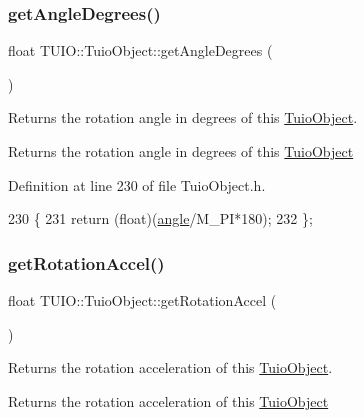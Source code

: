 \subsubsection{\texorpdfstring{get\+Angle\+Degrees()}{getAngleDegrees()}}
{\footnotesize\ttfamily float T\+U\+I\+O\+::\+Tuio\+Object\+::get\+Angle\+Degrees (\begin{DoxyParamCaption}{ }\end{DoxyParamCaption})\hspace{0.3cm}{\ttfamily [inline]}}

Returns the rotation angle in degrees of this \hyperlink{class_t_u_i_o_1_1_tuio_object}{Tuio\+Object}. \begin{DoxyReturn}{Returns}
the rotation angle in degrees of this \hyperlink{class_t_u_i_o_1_1_tuio_object}{Tuio\+Object} 
\end{DoxyReturn}


Definition at line 230 of file Tuio\+Object.\+h.


\begin{DoxyCode}
230                                 \{ 
231             \textcolor{keywordflow}{return} (\textcolor{keywordtype}{float})(\hyperlink{class_t_u_i_o_1_1_tuio_object_a1c5652a3ee1175156f13777f0d8068ee}{angle}/M\_PI*180);
232         \};
\end{DoxyCode}
\mbox{\label{class_t_u_i_o_1_1_tuio_object_a228d923c770dd1fe767ea5899c1258b6}} 
\subsubsection{\texorpdfstring{get\+Rotation\+Accel()}{getRotationAccel()}}
{\footnotesize\ttfamily float T\+U\+I\+O\+::\+Tuio\+Object\+::get\+Rotation\+Accel (\begin{DoxyParamCaption}{ }\end{DoxyParamCaption})\hspace{0.3cm}{\ttfamily [inline]}}

Returns the rotation acceleration of this \hyperlink{class_t_u_i_o_1_1_tuio_object}{Tuio\+Object}. \begin{DoxyReturn}{Returns}
the rotation acceleration of this \hyperlink{class_t_u_i_o_1_1_tuio_object}{Tuio\+Object} 
\end{DoxyReturn}


